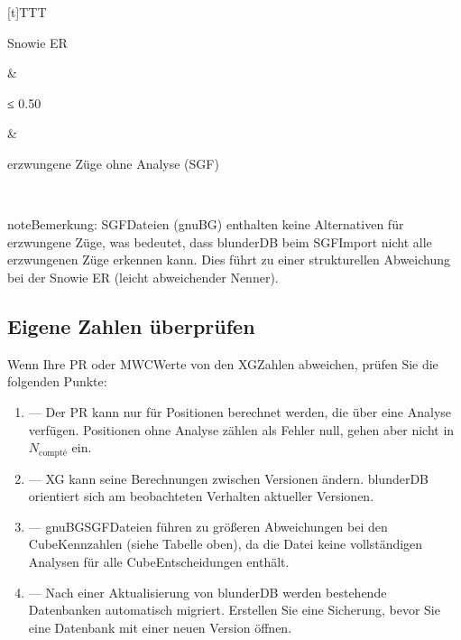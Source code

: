 \documentclass[letterpaper,10pt,german]{sphinxmanual}
\begin{document}
\begin{savenotes}
\begin{tabulary}{\linewidth}[t]{TTT}
\begin{varwidth}[t]{}
\sphinxAtStartPar
Snowie ER
\sphinxbeforeendvarwidth
\end{varwidth}%
&\begin{varwidth}[t]{}
\sphinxAtStartPar
≤ 0.50
\sphinxbeforeendvarwidth
\end{varwidth}%
&\begin{varwidth}[t]{}
\sphinxAtStartPar
erzwungene Züge ohne Analyse (SGF)
\sphinxbeforeendvarwidth
\end{varwidth}%
\\
\sphinxbottomrule
\end{tabulary}
\sphinxtableafterendhook\par
\sphinxattableend\end{savenotes}

\begin{sphinxadmonition}{note}{Bemerkung:}
\sphinxAtStartPar
SGF\sphinxhyphen{}Dateien (gnuBG) enthalten keine Alternativen für erzwungene Züge, was bedeutet, dass blunderDB beim SGF\sphinxhyphen{}Import nicht alle erzwungenen Züge erkennen kann. Dies führt zu einer strukturellen Abweichung bei der Snowie ER (leicht abweichender Nenner).
\end{sphinxadmonition}


\subsection{Eigene Zahlen überprüfen}
\label{\detokenize{stats_parity:valider-vos-propres-chiffres}}
\sphinxAtStartPar
Wenn Ihre PR\sphinxhyphen{} oder MWC\sphinxhyphen{}Werte von den XG\sphinxhyphen{}Zahlen abweichen, prüfen Sie die folgenden Punkte:
\begin{enumerate}
%
\item {} 
\sphinxAtStartPar
{} — Der PR kann nur für Positionen berechnet werden, die über eine Analyse verfügen. Positionen ohne Analyse zählen als Fehler null, gehen aber nicht in \(N_\text{compté}\) ein.

\item {} 
\sphinxAtStartPar
{} — XG kann seine Berechnungen zwischen Versionen ändern. blunderDB orientiert sich am beobachteten Verhalten aktueller Versionen.

\item {} 
\sphinxAtStartPar
{} — gnuBG\sphinxhyphen{}SGF\sphinxhyphen{}Dateien führen zu größeren Abweichungen bei den Cube\sphinxhyphen{}Kennzahlen (siehe Tabelle oben), da die Datei keine vollständigen Analysen für alle Cube\sphinxhyphen{}Entscheidungen enthält.

\item {} 
\sphinxAtStartPar
{} — Nach einer Aktualisierung von blunderDB werden bestehende Datenbanken automatisch migriert. Erstellen Sie eine Sicherung, bevor Sie eine Datenbank mit einer neuen Version öffnen.

\end{enumerate}
\end{document}
